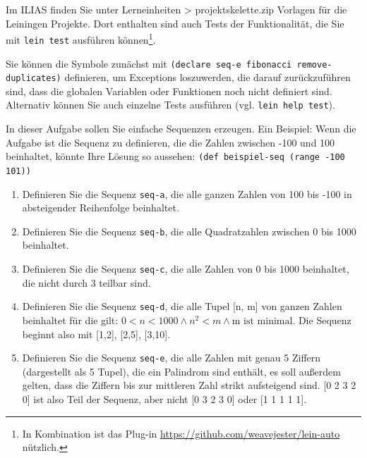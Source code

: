 \documentclass[11pt,a4paper]{article}
\begin{document}
Im ILIAS finden Sie unter Lerneinheiten > projektskelette.zip Vorlagen f\"ur die Leiningen Projekte.
Dort enthalten sind auch Tests der Funktionalit\"at, die Sie mit \verb|lein test| ausf\"uhren k\"onnen\footnote{In Kombination ist das Plug-in \url{https://github.com/weavejester/lein-auto} n\"utzlich.}.

Sie k\"onnen die Symbole zun\"achst mit \verb|(declare seq-e fibonacci remove-duplicates)| definieren,
um Exceptions loszuwerden, die darauf zur\"uckzuf\"uhren sind, dass die globalen Variablen oder Funktionen noch nicht definiert sind.
Alternativ k\"onnen Sie auch einzelne Tests ausf\"uhren (vgl. \verb|lein help test|).

\begin{exercise}[Sequenzen]

In dieser Aufgabe sollen Sie einfache Sequenzen erzeugen. Ein Beispiel: Wenn die Aufgabe ist die Sequenz zu definieren, die die Zahlen zwischen -100 und 100 beinhaltet, k\"onnte Ihre L\"osung so aussehen: \texttt{(def beispiel-seq (range -100 101))}
  

\begin{enumerate}[label=\alph*)]
  \item Definieren Sie die Sequenz \verb|seq-a|, die alle ganzen Zahlen von 100 bis -100 in absteigender Reihenfolge beinhaltet.
  \item Definieren Sie die Sequenz \verb|seq-b|, die alle Quadratzahlen zwischen 0 bis 1000 beinhaltet.
  \item Definieren Sie die Sequenz \verb|seq-c|, die alle Zahlen von 0 bis 1000 beinhaltet, die nicht durch 3 teilbar sind.
  \item Definieren Sie die Sequenz \verb|seq-d|, die alle Tupel [n, m] von ganzen Zahlen beinhaltet f\"ur die gilt: $0 < n < 1000 \wedge n^2 < m \wedge \text{m ist minimal}$. Die Sequenz beginnt also mit [1,2], [2,5], [3,10].
  \item Definieren Sie die Sequenz \verb|seq-e|, die alle Zahlen mit genau 5 Ziffern (dargestellt als 5 Tupel), die ein Palindrom sind enth\"alt, es soll au\ss{}erdem gelten, dass die Ziffern bis zur mittleren Zahl strikt aufsteigend sind. [0 2 3 2 0] ist also Teil der Sequenz, aber nicht [0 3 2 3 0] oder [1 1 1 1 1].
  
    
  \end{enumerate}
\end{exercise}
\end{document}
